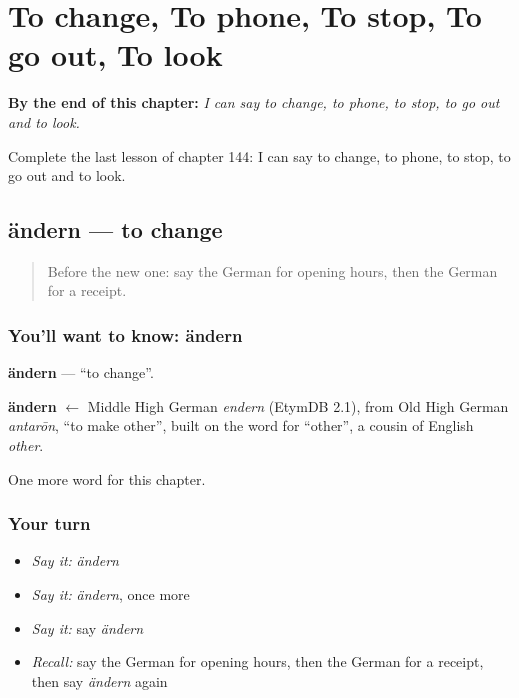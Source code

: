 
\chapter{To change, To phone, To stop, To go out, To look}
\label{ch:ge-to-change-to-phone-to-stop-to-go-out-to-look}

\begin{chapteropening}
\textbf{By the end of this chapter:} \emph{I can say to change, to phone, to stop, to go out and to look.}

Complete the last lesson of chapter 144: I can say to change, to phone, to stop, to go out and to look.
\end{chapteropening}

\section[ändern]{ändern — to change}

\label{lesson:GE-C144-aendern}



\begin{quote}
Before the new one: say the German for opening hours, then the German for a receipt.
\end{quote}

\subsection*{You'll want to know: ändern}
\textbf{ändern} — \textquotedblleft{}to change\textquotedblright{}.

\begin{cousinweb}
\textbf{ändern} $\leftarrow$ Middle High German \emph{endern} (EtymDB 2.1), from Old High German \emph{antarōn}, \textquotedblleft{}to make other\textquotedblright{}, built on the word for \textquotedblleft{}other\textquotedblright{}, a cousin of English \emph{other}.
\end{cousinweb}

\begin{grammarlens}[title={What you've built}]
One more word for this chapter.
\end{grammarlens}

\subsection*{Your turn}
\begin{itemize}
\raggedright
  \item \emph{Say it:} \emph{ändern}
  \item \emph{Say it:} \emph{ändern}, once more
  \item \emph{Say it:} say \emph{ändern}
  \item \emph{Recall:} say the German for opening hours, then the German for a receipt, then say \emph{ändern} again
\end{itemize}


